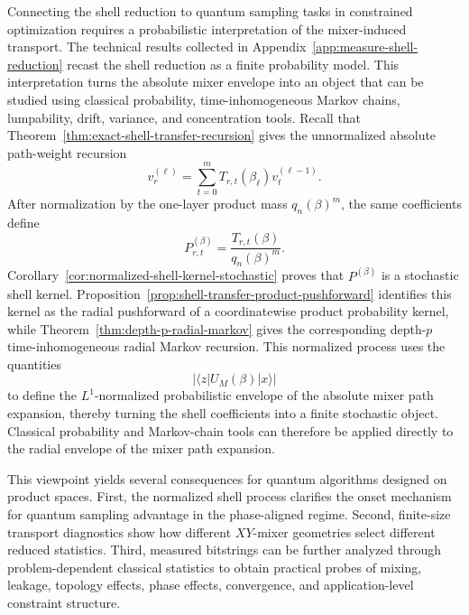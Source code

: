 \documentclass[a4paper,onecolumn,11pt,unpublished]{quantumarticle}
\theoremstyle{remark}
\begin{document}
Connecting the shell reduction to quantum sampling tasks in constrained optimization requires a probabilistic interpretation of the mixer-induced transport. The technical results collected in Appendix~\ref{app:measure-shell-reduction} recast the shell reduction as a finite probability model. This interpretation turns the absolute mixer
envelope into an object that can be studied using classical probability, time-inhomogeneous Markov chains, lumpability, drift, variance, and concentration tools. Recall that Theorem~\ref{thm:exact-shell-transfer-recursion} gives the unnormalized absolute path-weight recursion
\[
v_r^{(\ell)}
=
\sum_{t=0}^{m}T_{r,t}(\beta_\ell)v_t^{(\ell-1)}.
\]
After normalization by the one-layer product mass \(q_n(\beta)^m\), the same
coefficients define
\[
P_{r,t}^{(\beta)}
=
\frac{T_{r,t}(\beta)}{q_n(\beta)^m}.
\]
Corollary~\ref{cor:normalized-shell-kernel-stochastic} proves that \(P^{(\beta)}\) is a stochastic shell kernel.
Proposition~\ref{prop:shell-transfer-product-pushforward} identifies this kernel as the radial pushforward of a coordinatewise product probability kernel, while Theorem~\ref{thm:depth-p-radial-markov} gives the corresponding depth-\(p\) time-inhomogeneous radial Markov recursion. This normalized process uses the quantities
\[
\bigl|\langle z|U_M(\beta)|x\rangle\bigr|
\]
to define the \(L^1\)-normalized probabilistic envelope of the absolute mixer path expansion, thereby turning the shell coefficients into a finite stochastic object. Classical probability and Markov-chain tools can therefore be applied directly to the radial envelope of the mixer path expansion.

This viewpoint yields several consequences for quantum algorithms designed on product spaces. First, the normalized shell process clarifies the onset mechanism for quantum sampling advantage in the phase-aligned regime. Second,
finite-size transport diagnostics show how different \(XY\)-mixer geometries select different reduced statistics. Third, measured bitstrings can be further analyzed through problem-dependent classical statistics to obtain practical
probes of mixing, leakage, topology effects, phase effects, convergence, and application-level constraint structure.
\end{document}
